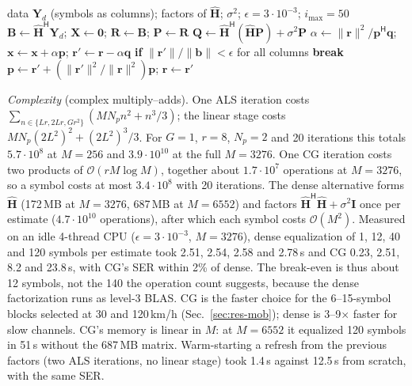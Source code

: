 \documentclass[conference,10pt]{IEEEtran}
\theoremstyle{remark}
\newcommand{\Hm}{\mathsf H}
\begin{document}
\begin{algorithm}[t]\caption{Matrix-free CG-MMSE equalization}\label{alg:cg}
\begin{algorithmic}[1]
\Require data $\bm Y_d$ (symbols as columns); factors of $\hat{\bm H}$; $\sigma^2$; $\epsilon=3\cdot10^{-3}$; $i_{\max}=50$
\State $\bm B\gets\hat{\bm H}^{\Hm}\bm Y_d$; $\bm X\gets\bm 0$; $\bm R\gets\bm B$; $\bm P\gets\bm R$
 
\State $\bm Q\gets\hat{\bm H}^{\Hm}(\hat{\bm H}\bm P)+\sigma^2\bm P$ 
\State $\alpha\gets\|\bm r\|^2/\bm p^{\Hm}\bm q$; $\bm x\gets\bm x+\alpha\bm p$; $\bm r'\gets\bm r-\alpha\bm q$
\State \textbf{if} $\|\bm r'\|/\|\bm b\|<\epsilon$ for all columns \textbf{break}
\State $\bm p\gets\bm r'+(\|\bm r'\|^2/\|\bm r\|^2)\bm p$; $\bm r\gets\bm r'$
\EndFor
\end{algorithmic}
\end{algorithm}

\emph{Complexity} (complex multiply--adds). One ALS iteration costs
$\sum_{n\in\{Lr,2Lr,Gr^2\}}(MN_pn^2+n^3/3)$; the linear stage costs $MN_p(2L^2)^2+(2L^2)^3/3$. For $G=1$, $r=8$, $N_p=2$
and 20 iterations this totals $5.7\cdot10^8$ at $M=256$ and $3.9\cdot10^{10}$ at the full $M=3276$. One CG iteration
costs two products of $\mathcal O(rM\log M)$, together about $1.7\cdot10^7$ operations at $M=3276$, so a symbol costs at most
$3.4\cdot10^8$ with 20 iterations. The dense alternative forms $\hat{\bm H}$ (172\,MB at $M=3276$, 687\,MB at $M=6552$) and
factors $\hat{\bm H}^{\Hm}\hat{\bm H}+\sigma^2\bm I$ once per estimate ($4.7\cdot10^{10}$ operations), after which each symbol
costs $\mathcal O(M^2)$. Measured on an idle 4-thread CPU ($\epsilon=3\cdot10^{-3}$, $M=3276$), dense equalization of
1, 12, 40 and 120 symbols per estimate took 2.51, 2.54, 2.58 and 2.78\,s and CG 0.23, 2.51, 8.2 and 23.8\,s, with CG's
SER within 2\% of dense. The break-even is thus about 12 symbols, not the 140 the operation count suggests, because
the dense factorization runs as level-3 BLAS. CG is the faster choice for the 6--15-symbol blocks selected at 30 and
120\,km/h (Sec.~\ref{sec:res-mob}); dense is 3--9$\times$ faster for slow channels. CG's memory is linear in $M$: at
$M=6552$ it equalized 120 symbols in 51\,s without the 687\,MB matrix.
Warm-starting a refresh from
the previous factors (two ALS iterations, no linear stage) took 1.4\,s against 12.5\,s from scratch, with the same SER.
\end{document}
